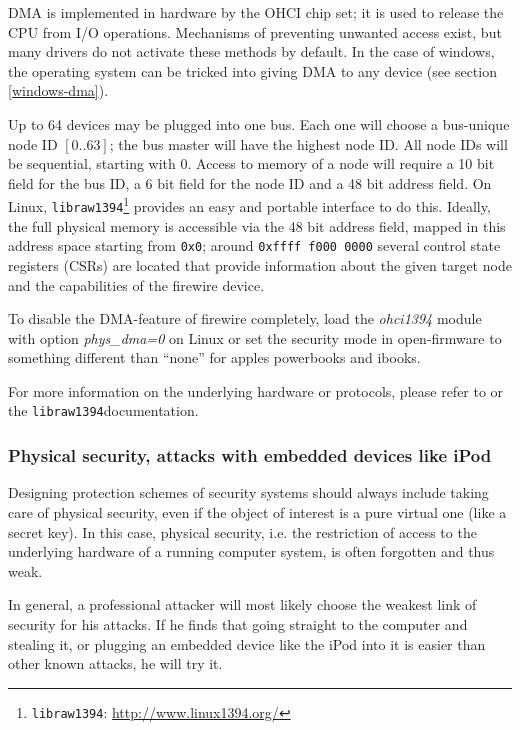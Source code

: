 DMA is implemented in hardware by the OHCI chip set; it is used to release the
CPU from I/O operations. Mechanisms of preventing unwanted access exist, but
many drivers do not activate these methods by default. In the case of windows,
the operating system can be tricked into giving DMA to any device (see section
\ref{windows-dma}).

Up to 64 devices may be plugged into one bus. Each one will choose a bus-unique
node ID $[0..63]$; the bus master will have the highest node ID. All node IDs
will be sequential, starting with 0. Access to memory of a node will require a
10 bit field for the bus ID, a 6 bit field for the node ID and a 48 bit address
field. On Linux, \texttt{libraw1394}\footnote{\texttt{libraw1394}:
\href{http://www.linux1394.org/}{http://www.linux1394.org/}} provides an easy
and portable interface to do this. Ideally, the full physical memory is
accessible via the 48 bit address field, mapped in this address space starting
from \texttt{0x0}; around \texttt{0xffff~f000~0000} several control state
registers (CSRs) are located that provide information about the given target
node and the capabilities of the firewire device.

To disable the DMA-feature of firewire completely, load the \emph{ohci1394}
module with option \emph{phys\_dma=0} on Linux or set the security mode in
open-firmware to something different than ``none'' for apples powerbooks and
ibooks. 

For more information on the underlying hardware or protocols, please refer to
\cite{OHCIspecs:2000,fwire_sys_arch:2222} or the
\texttt{libraw1394}\footnotemark[\value{footnote}] documentation.



\subsubsection{Physical security, attacks with embedded devices like iPod}

Designing protection schemes of security systems should always include taking
care of physical security, even if the object of interest is a pure virtual one
(like a secret key). In this case, physical security, i.e\@. the restriction of
access to the underlying hardware of a running computer system, is often
forgotten and thus weak.

In general, a professional attacker will most likely choose the weakest link of
security for his attacks. If he finds that going straight to the computer and
stealing it, or plugging an embedded device like the iPod into it is easier than
other known attacks, he will try it.

